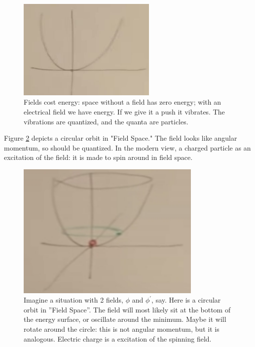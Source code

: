 \documentclass[]{article}
\begin{document}
\begin{figure}[H]
	\begin{center}
		\caption[Fields cost energy]{Fields cost energy: space without a field has zero energy; with an electrical field we have energy. If we give it a push it vibrates. The vibrations are quantized, and the quanta are particles. }\label{fig:higgs-fields-cost-energy}
		\includegraphics[width=0.6\textwidth]{higgs-fields-cost-energy}
	\end{center}
\end{figure}

Figure \ref{fig:2-appendix-field-circle} depicts a circular orbit in "Field Space." The field looks like angular momentum, so should be quantized. In the modern view,  a charged particle as an excitation of the field: it is made to spin around in field space.

\begin{figure}[H]
	\begin{center}
		\caption[Imagine a situation with 2 fields, $\phi$ and $\phi^{\prime}$, say.]{Imagine a situation with 2 fields, $\phi$ and $\phi^{\prime}$, say. Here is a circular orbit in ''Field Space''. The field will most likely sit at the bottom of the energy surface, or oscillate around the minimum. Maybe it will rotate around the circle: this is not angular momentum, but it is analogous. Electric charge is a excitation of the spinning field.}\label{fig:2-appendix-field-circle}
		\includegraphics[width=0.8\textwidth]{2-appendix-field-circle}
	\end{center}
\end{figure}
\end{document}

